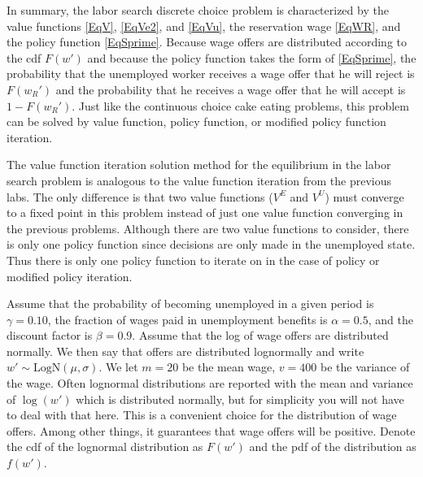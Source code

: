 In summary, the labor search discrete choice problem is characterized by the value functions \eqref{EqV}, \eqref{EqVe2}, and \eqref{EqVu}, the reservation wage \eqref{EqWR}, and the policy function \eqref{EqSprime}. Because wage offers are distributed according to the cdf $F(w')$ and because the policy function takes the form of \eqref{EqSprime}, the probability that the unemployed worker receives a wage offer that he will reject is $F(w_R')$ and the probability that he receives a wage offer that he will accept is $1 - F(w_R')$. Just like the continuous choice cake eating problems, this problem can be solved by value function, policy function, or modified policy function iteration.

The value function iteration solution method for the equilibrium in the labor search problem is analogous to the value function iteration from the previous labs. The only difference is that two value functions ($V^E$ and $V^U$) must converge to a fixed point in this problem instead of just one value function converging in the previous problems.  Although there are two value functions to consider, there is only one policy function since decisions are only made in the unemployed state.  Thus there is only one policy function to iterate on in the case of policy or modified policy iteration.

Assume that the probability of becoming unemployed in a given period is $\gamma = 0.10$, the fraction of wages paid in unemployment benefits is $\alpha = 0.5$, and the discount factor is $\beta = 0.9$. Assume that the log of wage offers are distributed normally.  We then say that offers are distributed lognormally and write $w'\sim \text{LogN}(\mu,\sigma)$.  We let $m=20$ be the mean wage, $v=400$ be the variance of the wage.  Often lognormal distributions are reported with the mean and variance of $\log(w')$ which is distributed normally, but for simplicity you will not have to deal with that here. This is a convenient choice for the distribution of wage offers.  Among other things, it guarantees that wage offers will be positive.  Denote the cdf of the lognormal distribution as $F(w')$ and the pdf of the distribution as $f(w')$.

